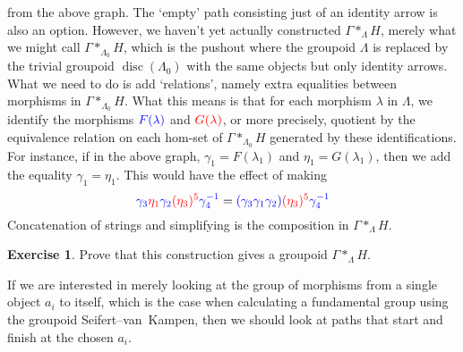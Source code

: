 \documentclass{tufte-handout}
\DeclareMathOperator{\disc}{disc}
\theoremstyle{definition}
\newtheorem{ex}{Exercise}
\begin{document}
from the above graph. The `empty' path consisting just of an identity arrow is also an 
option. However, we haven't yet actually constructed $\Gamma\ast_\Lambda H$, merely what 
we might call $\Gamma \ast_{\Lambda_0}H$, which 
is the pushout where the groupoid $\Lambda$ is replaced by the trivial groupoid 
$\disc(\Lambda_0)$ with the same objects but only identity arrows. What we need to do is 
add `relations', namely extra equalities between morphisms in $\Gamma 
\ast_{\Lambda_0}H$. What this means is that for each morphism $\lambda$ in $\Lambda$, we 
identify the morphisms ${\color{blue}F(\lambda)}$ and ${\color{red}G(\lambda)}$, or more 
precisely, quotient by the equivalence relation on each hom-set of $\Gamma 
\ast_{\Lambda_0}H$ generated by these identifications. For instance, if in the above 
graph, $\gamma_1=F(\lambda_1)$ and $\eta_1 = G(\lambda_1)$, then we add the equality 
$\gamma_1=\eta_1$. This would have the effect of making
\[
	{\color{blue}\gamma_3}{\color{red}\eta_1}{\color{blue}\gamma_2}{\color{red}(\eta_3)^5}{\color{blue}\gamma_4^{-1}} = 
	{\color{blue}(\gamma_3\gamma_1\gamma_2)}{\color{red}(\eta_3)^5}{\color{blue}\gamma_4^{-1}}	
\]
Concatenation of strings and simplifying is the composition in $\Gamma\ast_\Lambda H$.

\begin{ex}
Prove that this construction gives a groupoid $\Gamma\ast_\Lambda H$.
\end{ex}

If we are interested in merely looking at the group of morphisms from a single object $a_i$ to itself,
which is the case when calculating a fundamental group using the groupoid Seifert--van~Kampen,
then we should look at paths that start and finish at the chosen $a_i$.
\end{document}
